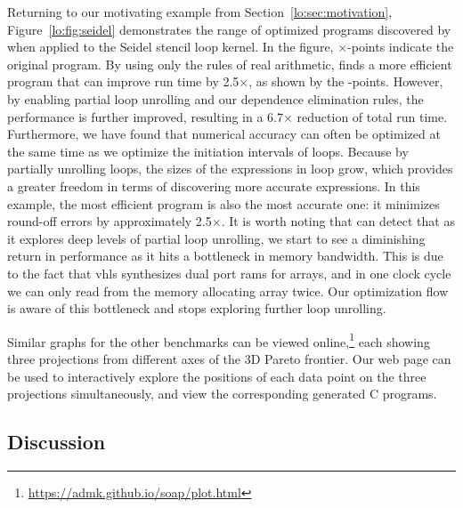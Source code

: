 Returning to our motivating example from Section~\ref{lo:sec:motivation},
Figure~\ref{lo:fig:seidel} demonstrates the range of optimized programs
discovered by \soap{} when applied to the Seidel stencil loop kernel. In the
figure, $\times$-points indicate the original program. By using only the rules
of real arithmetic, \soap{} finds a more efficient program that can improve run
time by 2.5$\times$, as shown by the \redcircle-points. However, by enabling
partial loop unrolling and our dependence elimination rules, the performance
is further improved, resulting in a 6.7$\times$ reduction of total run time.
Furthermore, we have found that numerical accuracy can often be optimized at
the same time as we optimize the initiation intervals of loops. Because by
partially unrolling loops, the sizes of the expressions in loop grow, which
provides \soap{} a greater freedom in terms of discovering more accurate
expressions. In this example, the most efficient program is also the most
accurate one: it minimizes round-off errors by approximately 2.5$\times$. It is
worth noting that \soap{} can detect that as it explores deep levels of partial
loop unrolling, we start to see a diminishing return in performance as it hits
a bottleneck in memory bandwidth.  This is due to the fact that \gls{vhls}
synthesizes dual port \glspl{ram} for arrays, and in one clock cycle we can
only read from the memory allocating array twice.  Our optimization flow is
aware of this bottleneck and stops exploring further loop unrolling.

Similar graphs for the other benchmarks can be viewed
online,\footnote{\url{https://admk.github.io/soap/plot.html}} each showing
three projections from different axes of the 3D Pareto frontier. Our web page
can be used to interactively explore the positions of each data point on the
three projections simultaneously, and view the corresponding generated C
programs.

\subsection{Discussion}
\label{lo:sub:discussion}

